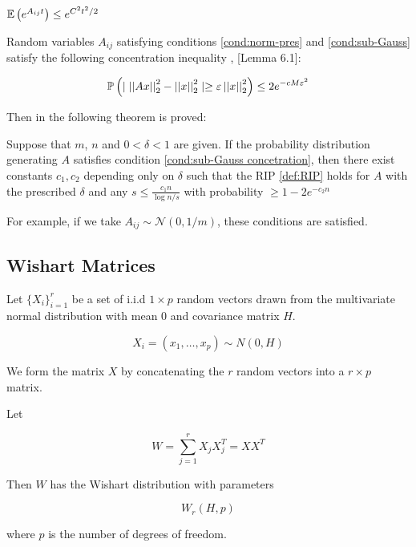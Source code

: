 \documentclass{article}
\begin{document}
\begin{condition}
\({\mathbb{E}}\left( e^{A_{ij}t} \right) \leq e^{C^2 t^2 /2}\)
\label{cond:sub-Gauss}
\end{condition}

Random variables \(A_{ij}\) satisfying conditions \eqref{cond:norm-pres} and \eqref{cond:sub-Gauss} satisfy the following concentration inequality \cite{baraniuk2008simple}, \cite{Devore09instance-optimalityin}[Lemma 6.1]:

\begin{condition}
\begin{equation}
{\mathbb{P}}\left( \mid \left|\left|Ax\right|\right|_2^2 - \left|\left|x\right|\right|_2^2 \mid \geq \varepsilon  \left|\left|x\right|\right|_2^2 \right) \leq 2e^{-cM\varepsilon^2}
\label{cond:sub-Gauss concetration}
\end{equation} 
\end{condition}

Then in \cite{baraniuk2008simple} the following theorem is proved:

\begin{theorem}
Suppose that \(m\), \(n\) and \(0 < \delta < 1\) are given. If the probability distribution generating \(A\) satisfies condition \eqref{cond:sub-Gauss concetration}, then there exist constants \(c_1, c_2\) depending only on \(\delta\) such that the RIP \eqref{def:RIP} holds for \(A\) with the prescribed \(\delta\) and any  \(s \leq \frac{c_1 n}{\log{n/s}}\) with probability \(\geq 1-2e^{-c_2n}\) 
\end{theorem}

For example, if we take \(A_{ij} \sim \mathcal{N}\left(0, 1/m\right)\), these conditions are satisfied. 

\subsection{Wishart Matrices}

Let \(\{X_i\}_{i=1}^r\) be a set of i.i.d \(1 \times p\) random vectors drawn from the multivariate normal distribution with mean 0 and covariance matrix \(H\).

\begin{equation}
X_i = \left(x_1, \ldots , x_p\right) \sim N\left(0, H\right)
\end{equation}

We form the matrix \(X\) by concatenating the \(r\) random vectors into a \(r \times p\) matrix.

\begin{definition}
Let 

\begin{equation}
W = \sum_{j=1}^r X_j X_j^T =  X X^T
\end{equation}

Then \(W\) has the Wishart distribution with parameters 

\begin{equation}
W_r\left(H, p\right)
\end{equation}

where \(p\) is the number of degrees of freedom.
\end{definition}
\end{document}
